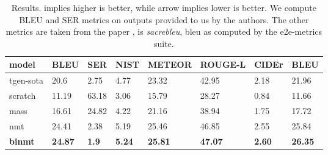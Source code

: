 \documentclass[11pt,a4paper]{article}
\begin{document}
\begin{table*}[t]
\begin{tabular}{llllllll}
\hline
model                           & BLEU       & SER               & NIST                 & METEOR                & ROUGE-L               & CIDEr                & BLEU   \\ 
\hline
tgen-sota             & 20.6                            & 2.75                          & 4.77                           & 23.32                           & 42.95                           & 2.18                           & 21.96                              \\
scratch                         & 11.19                           & 63.18                         & 3.06                           & 15.79                           & 28.27                           & 0.84                           & 11.66                              \\
mass                            & 16.61                           & 24.82                         & 4.22                           & 21.16                           & 38.94                           & 1.75                           & 17.72                              \\
nmt                             & 24.41                           & 2.38                          & 5.19 & 25.46                           & 46.85                           & 2.55                           & 25.84   \\
\textbf{binmt}              & \textbf{24.87}                    & \textbf{1.9}                        & \textbf{5.24} & \textbf{25.81}  & \textbf{47.07}    & \textbf{2.60} & \textbf{26.35}  \\ 
\hline
\end{tabular}
\caption{Results.  implies higher is better, while  arrow implies lower is better.  We compute BLEU and SER metrics on outputs provided to us by the authors. The other metrics are taken from the paper \citep{duvsek2019neural},
 is \textsl{sacrebleu},  bleu as computed by the e2e-metrics suite.}
\label{results-main}
\end{table*}
\end{document}
